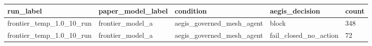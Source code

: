 \begin{tabular}{lllll}
 \hline
run\_label & paper\_model\_label & condition & aegis\_decision & count \\
 \hline
frontier\_temp\_1.0\_10\_run & frontier\_model\_a & aegis\_governed\_mesh\_agent & block & 348 \\
frontier\_temp\_1.0\_10\_run & frontier\_model\_a & aegis\_governed\_mesh\_agent & fail\_closed\_no\_action & 72 \\
 \hline
\end{tabular}
